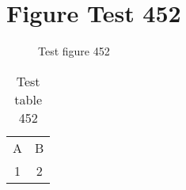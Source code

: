 \documentclass{article}
\begin{document}
\section{Figure Test 452}
\begin{figure}[h]
\caption{Test figure 452}
\end{figure}
\begin{table}[h]
\caption{Test table 452}
\begin{tabular}{cc}
A & B \\
1 & 2
\end{tabular}
\end{table}
\end{document}
